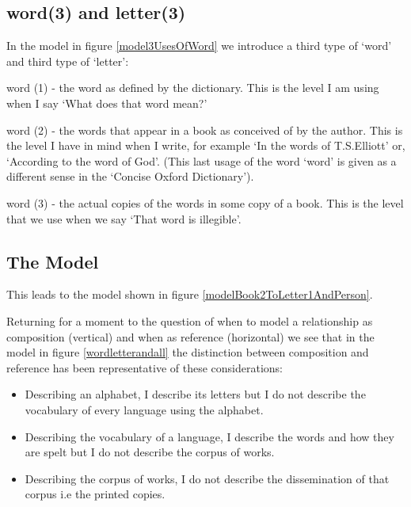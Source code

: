 \subsection{word(3) and letter(3)}
\noindent In the model in figure \ref{model3UsesOfWord} we introduce a third type of  `word' and third type of `letter':\\
\begin{erquote}
word (1) - the word as defined by the dictionary. This is the level I am using when I say `What does that word mean?' 
\end{erquote}
\begin{erquote}
word (2) - the words that appear in a book as conceived of by the author. This is the level I have in mind when I write, 
for example  `In the words of T.S.Elliott' or, `According to the word of God'. (This last usage of the word `word' is given as a 
different sense in the `Concise Oxford Dictionary'). 
\end{erquote}
\begin{erquote}
word (3) - the actual copies of the words in some copy of a book. This is the level that we use when we say `That word is illegible'.
\end{erquote}


\subsection{The Model}
This leads to the model shown in figure \ref{modelBook2ToLetter1AndPerson}.


\noindent Returning for a moment to the question of when to model a relationship as composition (vertical) and when as reference (horizontal)
we see that in the model in figure \ref{wordletterandall} the distinction between composition and reference has been representative of these considerations:
\begin{itemize}
\item{Describing an alphabet, I describe its letters but I do not describe the vocabulary of every language using the alphabet.}
\item{Describing the vocabulary of a language, I describe the words and how they are spelt but I do not describe the corpus of works.}
\item{Describing the corpus of works, I do not describe the dissemination of that corpus i.e the printed copies.}
\end{itemize}

